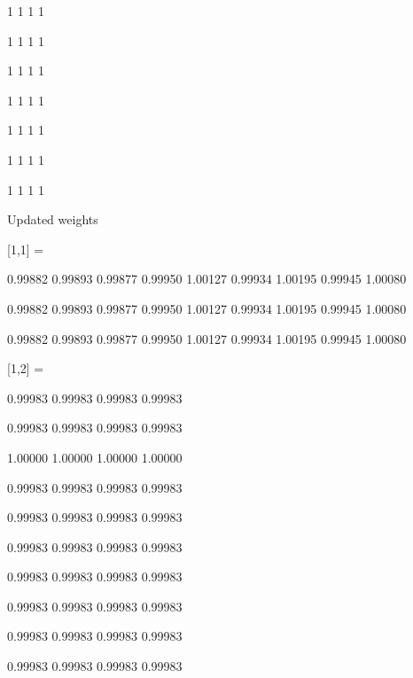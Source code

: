 \documentclass[10pt]{article}
\begin{document}
\begin{flushleft}
{     1   1   1   1

     1   1   1   1

     1   1   1   1

     1   1   1   1

     1   1   1   1

     1   1   1   1

     1   1   1   1

}

Updated weights

{
  [1,1] =

     0.99882   0.99893   0.99877   0.99950   1.00127   0.99934   1.00195   0.99945   1.00080

     0.99882   0.99893   0.99877   0.99950   1.00127   0.99934   1.00195   0.99945   1.00080

     0.99882   0.99893   0.99877   0.99950   1.00127   0.99934   1.00195   0.99945   1.00080

  [1,2] =

     0.99983   0.99983   0.99983   0.99983

     0.99983   0.99983   0.99983   0.99983

     1.00000   1.00000   1.00000   1.00000

     0.99983   0.99983   0.99983   0.99983

     0.99983   0.99983   0.99983   0.99983

     0.99983   0.99983   0.99983   0.99983

     0.99983   0.99983   0.99983   0.99983

     0.99983   0.99983   0.99983   0.99983

     0.99983   0.99983   0.99983   0.99983

     0.99983   0.99983   0.99983   0.99983

}


\end{flushleft}
\end{document}
